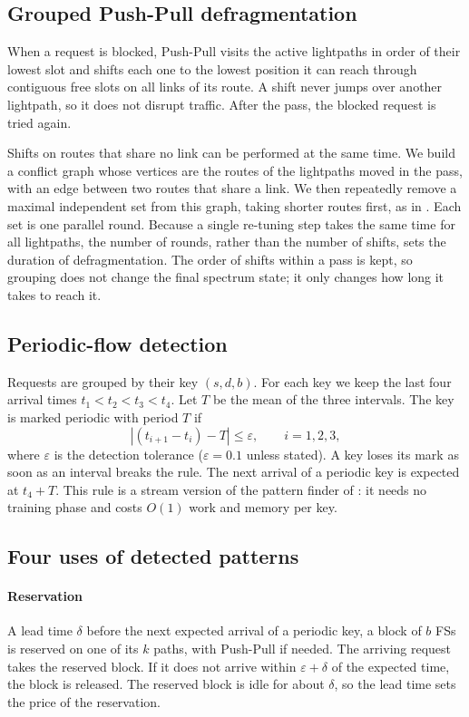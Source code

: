 \documentclass[preprint,12pt]{elsarticle}
\begin{document}
\subsection{Grouped Push-Pull defragmentation}
When a request is blocked, Push-Pull \cite{cugini2013} visits the active lightpaths in order of their lowest slot and shifts each one to the lowest position it can reach through contiguous free slots on all links of its route. A shift never jumps over another lightpath, so it does not disrupt traffic. After the pass, the blocked request is tried again.

Shifts on routes that share no link can be performed at the same time. We build a conflict graph whose vertices are the routes of the lightpaths moved in the pass, with an edge between two routes that share a link. We then repeatedly remove a maximal independent set from this graph, taking shorter routes first, as in \cite{shakya2013}. Each set is one parallel round. Because a single re-tuning step takes the same time for all lightpaths, the number of rounds, rather than the number of shifts, sets the duration of defragmentation. The order of shifts within a pass is kept, so grouping does not change the final spectrum state; it only changes how long it takes to reach it.

\subsection{Periodic-flow detection}
Requests are grouped by their key $(s,d,b)$. For each key we keep the last four arrival times $t_1<t_2<t_3<t_4$. Let $T$ be the mean of the three intervals. The key is marked periodic with period $T$ if
\begin{equation}
\left| (t_{i+1}-t_i) - T \right| \le \varepsilon,\qquad i=1,2,3,
\end{equation}
where $\varepsilon$ is the detection tolerance ($\varepsilon=0.1$ unless stated). A key loses its mark as soon as an interval breaks the rule. The next arrival of a periodic key is expected at $t_4+T$. This rule is a stream version of the pattern finder of \cite{malayeri2022}: it needs no training phase and costs $O(1)$ work and memory per key.

\subsection{Four uses of detected patterns}
\paragraph{Reservation} A lead time $\delta$ before the next expected arrival of a periodic key, a block of $b$ FSs is reserved on one of its $k$ paths, with Push-Pull if needed. The arriving request takes the reserved block. If it does not arrive within $\varepsilon+\delta$ of the expected time, the block is released. The reserved block is idle for about $\delta$, so the lead time sets the price of the reservation.
\end{document}

